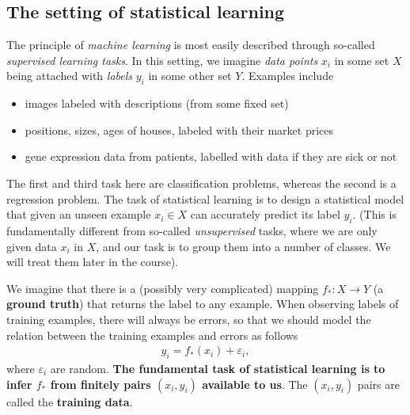 \documentclass{article}
\begin{document}
\subsection{The setting of statistical learning}
The principle of \emph{machine learning} is most easily described through so-called \emph{supervised learning tasks}. In this setting, we imagine \emph{data points} $x_i$ in some set $X$
being attached with \emph{labels} $y_i$ in some other set $Y$. Examples include 
\begin{itemize}
    \item images labeled with descriptions (from some fixed set)
    \item positions, sizes, ages of houses, labeled with their market prices
    \item gene expression data from patients, labelled with data if they are sick or not 
\end{itemize}
The first and third task here are classification problems, whereas the second is a regression problem.
The task of statistical learning is to design a statistical model that given an unseen example $x_i \in X$ can accurately predict its label $y_i$. (This is fundamentally different from so-called \emph{unsupervised} tasks, where we are only given data $x_i$ in $X$, and our task is to group them into a number of classes. We will treat them later in the course).

We imagine that there is a (possibly very complicated)  mapping $f_*:X \to Y$ (a \textbf{ground truth}) that returns the label to any example. When observing labels of training examples, there will always be errors, so that we should model the relation between the training examples and errors as follows
\begin{align}
    y_i = f_*(x_i) + \varepsilon_i, \label{eq:model}
\end{align}
where $\varepsilon_i$ are random. \textbf{The fundamental task of statistical learning is to infer $f_*$ from finitely pairs $(x_i,y_i)$ available to us}. The $(x_i,y_i)$ pairs are called the \textbf{training data}.
\end{document}
